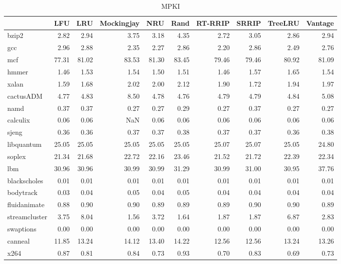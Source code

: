 \begin{table}
\caption{MPKI}
\label{tab:mpki}
\begin{tabular}{lrrrrrrrrr}
\toprule
 & LFU & LRU & Mockingjay & NRU & Rand & RT-RRIP & SRRIP & TreeLRU & Vantage \\
\midrule
bzip2 & 2.82 & 2.94 & 3.75 & 3.18 & 4.35 & 2.72 & 3.05 & 2.86 & 2.94 \\
gcc & 2.96 & 2.88 & 2.35 & 2.27 & 2.86 & 2.20 & 2.86 & 2.49 & 2.76 \\
mcf & 77.31 & 81.02 & 83.53 & 81.30 & 83.45 & 79.46 & 79.46 & 80.92 & 81.09 \\
hmmer & 1.46 & 1.53 & 1.54 & 1.50 & 1.51 & 1.46 & 1.57 & 1.65 & 1.54 \\
xalan & 1.59 & 1.68 & 2.02 & 2.00 & 2.12 & 1.90 & 1.72 & 1.94 & 1.97 \\
cactusADM & 4.77 & 4.83 & 8.50 & 4.78 & 4.76 & 4.79 & 4.79 & 4.84 & 5.08 \\
namd & 0.37 & 0.37 & 0.27 & 0.27 & 0.29 & 0.27 & 0.37 & 0.27 & 0.27 \\
calculix & 0.06 & 0.06 & NaN & 0.06 & 0.06 & 0.06 & 0.06 & 0.06 & 0.06 \\
sjeng & 0.36 & 0.36 & 0.37 & 0.37 & 0.38 & 0.37 & 0.37 & 0.36 & 0.38 \\
libquantum & 25.05 & 25.05 & 25.05 & 25.05 & 25.05 & 25.07 & 25.07 & 25.05 & 24.80 \\
soplex & 21.34 & 21.68 & 22.72 & 22.16 & 23.46 & 21.52 & 21.72 & 22.39 & 22.34 \\
lbm & 30.96 & 30.96 & 30.99 & 30.99 & 31.29 & 30.99 & 31.00 & 30.95 & 37.76 \\
blackscholes & 0.01 & 0.01 & 0.01 & 0.01 & 0.01 & 0.01 & 0.01 & 0.01 & 0.01 \\
bodytrack & 0.03 & 0.04 & 0.05 & 0.04 & 0.05 & 0.04 & 0.04 & 0.04 & 0.04 \\
fluidanimate & 0.88 & 0.90 & 0.90 & 0.89 & 0.89 & 0.89 & 0.90 & 0.90 & 0.89 \\
streamcluster & 3.75 & 8.04 & 1.56 & 3.72 & 1.64 & 1.87 & 1.87 & 6.87 & 2.83 \\
swaptions & 0.00 & 0.00 & 0.00 & 0.00 & 0.00 & 0.00 & 0.00 & 0.00 & 0.00 \\
canneal & 11.85 & 13.24 & 14.12 & 13.40 & 14.22 & 12.56 & 12.56 & 13.24 & 13.26 \\
x264 & 0.87 & 0.81 & 0.84 & 0.73 & 0.93 & 0.70 & 0.83 & 0.69 & 0.73 \\
\bottomrule
\end{tabular}
\end{table}
